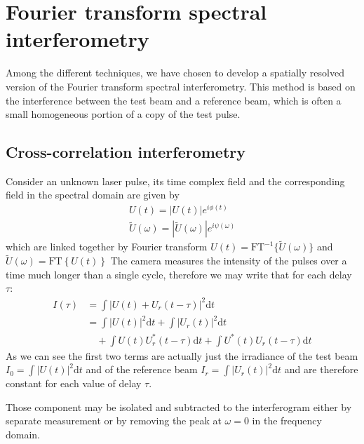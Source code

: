 \documentclass[12pt,a4paper,twoside]{article}
\begin{document}
\clearpage
\section{Fourier transform spectral interferometry}
Among the different techniques, we have chosen to develop a spatially resolved version of the Fourier transform spectral interferometry.
This method is based on the interference between the test beam and a reference beam, which is often a small homogeneous portion of a copy of the test pulse.

\subsection{Cross-correlation interferometry}
Consider an unknown laser pulse, its time complex field and the corresponding field in the spectral domain are given by
\begin{gather}
	U(t) = |U(t)|e^{i\phi(t)} \\
	\tilde{U}(\omega) = |\tilde{U}(\omega)|e^{i\psi(\omega)}
	\label{eq_def}
\end{gather}
which are linked together by Fourier transform $U(t) = \mathrm{FT}^{-1} \lbrace \tilde{U}(\omega) \rbrace$ and $\tilde{U}(\omega) = \mathrm{FT} \left\lbrace U(t) \right\rbrace$
The camera measures the intensity of the pulses over a time much longer than a single cycle, therefore we may write that for each delay $\tau$:
\begin{align}
	I(\tau) 	&= \int|U(t)+U_r(t-\tau)|^2\mathrm{d}t \nonumber\\
			&= \int|U(t)|^2\mathrm{d}t + \int|U_r(t)|^2\mathrm{d}t \nonumber\\
			&\quad + \int U(t)U_r^*(t-\tau)\mathrm{d}t + \int U^*(t)U_r(t-\tau)\mathrm{d}t 
	\label{eq_autocorr}
\end{align}
As we can see the first two terms are actually just the irradiance of the test beam $I_0 = \int|U(t)|^2\mathrm{d}t$ and of the reference beam $I_r = \int|U_r(t)|^2\mathrm{d}t$ and are therefore constant for each value of delay $\tau$.

Those component may be isolated and subtracted to the interferogram either by separate measurement or by removing the peak at $\omega = 0$ in the frequency domain.
\end{document}
